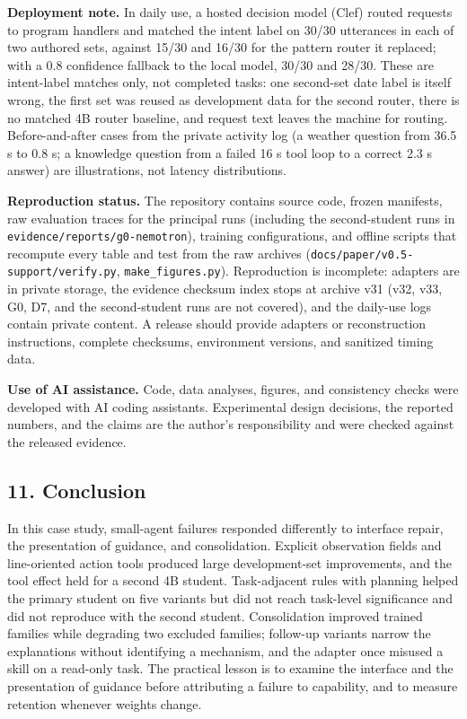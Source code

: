 \documentclass[
  10pt,
]{article}
\begin{document}
\textbf{Deployment note.} In daily use, a hosted decision model (Clef)
routed requests to program handlers and matched the intent label on
30/30 utterances in each of two authored sets, against 15/30 and 16/30
for the pattern router it replaced; with a 0.8 confidence fallback to
the local model, 30/30 and 28/30. These are intent-label matches only,
not completed tasks: one second-set date label is itself wrong, the
first set was reused as development data for the second router, there is
no matched 4B router baseline, and request text leaves the machine for
routing. Before-and-after cases from the private activity log (a weather
question from 36.5 s to 0.8 s; a knowledge question from a failed 16 s
tool loop to a correct 2.3 s answer) are illustrations, not latency
distributions.

\textbf{Reproduction status.} The repository contains source code,
frozen manifests, raw evaluation traces for the principal runs
(including the second-student runs in
\texttt{evidence/reports/g0-nemotron}), training configurations, and
offline scripts that recompute every table and test from the raw
archives (\texttt{docs/paper/v0.5-support/verify.py},
\texttt{make\_figures.py}). Reproduction is incomplete: adapters are in
private storage, the evidence checksum index stops at archive v31 (v32,
v33, G0, D7, and the second-student runs are not covered), and the
daily-use logs contain private content. A release should provide
adapters or reconstruction instructions, complete checksums, environment
versions, and sanitized timing data.

\textbf{Use of AI assistance.} Code, data analyses, figures, and
consistency checks were developed with AI coding assistants.
Experimental design decisions, the reported numbers, and the claims are
the author's responsibility and were checked against the released
evidence.

\subsection{11. Conclusion}\label{conclusion}

In this case study, small-agent failures responded differently to
interface repair, the presentation of guidance, and consolidation.
Explicit observation fields and line-oriented action tools produced
large development-set improvements, and the tool effect held for a
second 4B student. Task-adjacent rules with planning helped the primary
student on five variants but did not reach task-level significance and
did not reproduce with the second student. Consolidation improved
trained families while degrading two excluded families; follow-up
variants narrow the explanations without identifying a mechanism, and
the adapter once misused a skill on a read-only task. The practical
lesson is to examine the interface and the presentation of guidance
before attributing a failure to capability, and to measure retention
whenever weights change.
\end{document}
